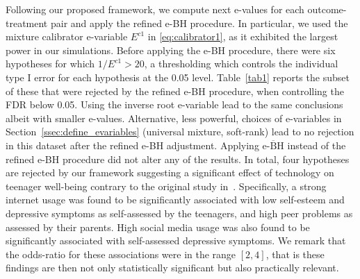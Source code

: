 \documentclass[pdflatex,sn-mathphys-num]{sn-jnl}%
\theoremstyle{thmstyleone}%
\theoremstyle{thmstyletwo}%
\theoremstyle{thmstylethree}%
\newcommand{\david}[1]{{\small{\color{blue} \sf $\heartsuit$ [David: #1]}}}
\newcommand{\paul}[1]{{\small{\color{green} \sf $\spadesuit$ Paul: #1}}}
\begin{document}
Following our proposed framework, we compute next e-values for each outcome-treatment pair and apply the refined e-BH procedure. In particular, we used the mixture calibrator e-variable $E^{c1}$ in \eqref{eq:calibrator1}, as it exhibited the largest power in our simulations. 
Before applying the e-BH procedure, there were six hypotheses for which $1/E^{c1} > 20$, a thresholding which controls the individual type I error for each hypothesis at the 0.05 level.
Table~\ref{tab1} reports the subset of these that were rejected by the refined e-BH procedure, when controlling the FDR below 0.05. Using the inverse root e-variable lead to the same conclusions albeit with smaller e-values. Alternative, less powerful, choices of e-variables in Section~\ref{ssec:define_evariables} (universal mixture, soft-rank) lead to no rejection in this dataset after the refined e-BH adjustment. Applying $\overline{\text{e-BH}}$ instead of the refined e-BH procedure did not alter any of the results. In total, four hypotheses are rejected by our framework suggesting a significant effect of technology on teenager well-being contrary to the original study in~\cite{orben:2019}. Specifically, a strong internet usage was found to be significantly associated with low self-esteem and depressive symptoms as self-assessed by the teenagers, and high peer problems as assessed by their parents.
High social media usage was also found to be significantly associated with self-assessed depressive symptoms.
We remark that the odds-ratio for these associations were in the range $[2,4]$, 
that is these findings are then not only statistically significant but also practically relevant.


\end{document}
